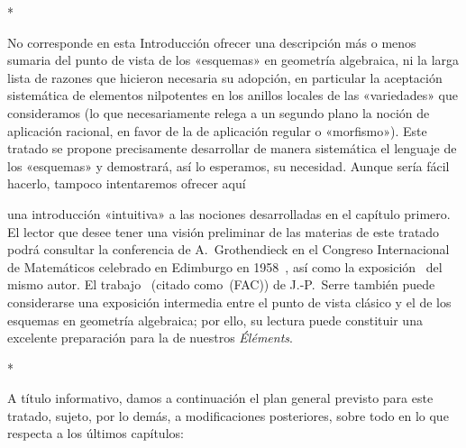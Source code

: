 \bigskip
\begin{center}*\quad*\quad*\end{center}
\bigskip

No corresponde en esta Introducción ofrecer una descripción más o menos sumaria del punto de vista de los «esquemas» en geometría algebraica, ni la larga lista de razones que hicieron necesaria su adopción, en particular la aceptación sistemática de elementos nilpotentes en los anillos locales de las «variedades» que consideramos (lo que necesariamente relega a un segundo plano la noción de aplicación racional, en favor de la de aplicación regular o «morfismo»).
Este tratado se propone precisamente desarrollar de manera sistemática el lenguaje de los «esquemas» y demostrará, así lo esperamos, su necesidad.
Aunque sería fácil hacerlo, tampoco intentaremos ofrecer aquí

una introducción «intuitiva» a las nociones desarrolladas en el capítulo primero.
El lector que desee tener una visión preliminar de las materias de este tratado podrá consultar la conferencia de A.~Grothendieck en el Congreso Internacional de Matemáticos celebrado en Edimburgo en 1958~\cite{I-7}, así como la exposición~\cite{I-8} del mismo autor.
El trabajo~\cite{I-14} (citado como~(FAC)) de J.-P.~Serre también puede considerarse una exposición intermedia entre el punto de vista clásico y el de los esquemas en geometría algebraica; por ello, su lectura puede constituir una excelente preparación para la de nuestros \emph{Éléments}.

\bigskip
\begin{center}*\quad*\quad*\end{center}
\bigskip

A título informativo, damos a continuación el plan general previsto para este tratado, sujeto, por lo demás, a modificaciones posteriores, sobre todo en lo que respecta a los últimos capítulos:

